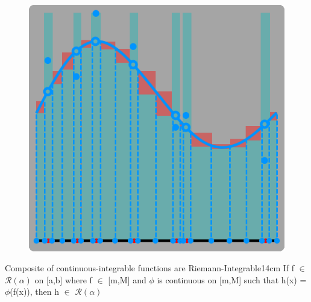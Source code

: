     \begin{figure}[h]
        \centering
        \includegraphics[scale=0.35]{Images/13.2.3.png}
    \end{figure}

    \newpage



    \begin{wtheorem}
    {Composite of continuous-integrable functions are Riemann-Integrable}{14cm}
        If f $\in$ $\mathscr{R}(\alpha)$ on [a,b] where f $\in$ [m,M] and
        $\phi$ is continuous on [m,M] such that h(x) = $\phi$(f(x)), then
        h $\in$ $\mathscr{R}(\alpha)$        
    \end{wtheorem}

